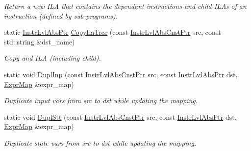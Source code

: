 \begin{DoxyCompactItemize}
\begin{DoxyCompactList}\small\item\em Return a new I\+LA that contains the dependant instructions and child-\/\+I\+L\+As of an instruction (defined by sub-\/programs). \end{DoxyCompactList}\item 
\mbox{\label{classilang_1_1_abs_knob_a3ff1b99e985e4eb00935a520158238c9}} 
static \mbox{\hyperlink{namespaceilang_ad1b30fdf347e493b3937143da05d1a72}{Instr\+Lvl\+Abs\+Ptr}} \mbox{\hyperlink{classilang_1_1_abs_knob_a3ff1b99e985e4eb00935a520158238c9}{Copy\+Ila\+Tree}} (const \mbox{\hyperlink{namespaceilang_adc86156b73aa1a4b6369645e9b96ff19}{Instr\+Lvl\+Abs\+Cnst\+Ptr}} src, const std\+::string \&dst\+\_\+name)
\begin{DoxyCompactList}\small\item\em Copy and I\+LA (including child). \end{DoxyCompactList}\item 
\mbox{\label{classilang_1_1_abs_knob_aa79eb1890ea9f4bfbe798f27c76445cb}} 
static void \mbox{\hyperlink{classilang_1_1_abs_knob_aa79eb1890ea9f4bfbe798f27c76445cb}{Dupl\+Inp}} (const \mbox{\hyperlink{namespaceilang_adc86156b73aa1a4b6369645e9b96ff19}{Instr\+Lvl\+Abs\+Cnst\+Ptr}} src, const \mbox{\hyperlink{namespaceilang_ad1b30fdf347e493b3937143da05d1a72}{Instr\+Lvl\+Abs\+Ptr}} dst, \mbox{\hyperlink{namespaceilang_ad40e6475e04844bcad9c380aac0b215c}{Expr\+Map}} \&expr\+\_\+map)
\begin{DoxyCompactList}\small\item\em Duplicate input vars from src to dst while updating the mapping. \end{DoxyCompactList}\item 
\mbox{\label{classilang_1_1_abs_knob_aa0de40a37d10a938d307ad58b69952bc}} 
static void \mbox{\hyperlink{classilang_1_1_abs_knob_aa0de40a37d10a938d307ad58b69952bc}{Dupl\+Stt}} (const \mbox{\hyperlink{namespaceilang_adc86156b73aa1a4b6369645e9b96ff19}{Instr\+Lvl\+Abs\+Cnst\+Ptr}} src, const \mbox{\hyperlink{namespaceilang_ad1b30fdf347e493b3937143da05d1a72}{Instr\+Lvl\+Abs\+Ptr}} dst, \mbox{\hyperlink{namespaceilang_ad40e6475e04844bcad9c380aac0b215c}{Expr\+Map}} \&expr\+\_\+map)
\begin{DoxyCompactList}\small\item\em Duplicate state vars from src to dst while updating the mapping. \end{DoxyCompactList}\item 

\end{DoxyCompactItemize}
